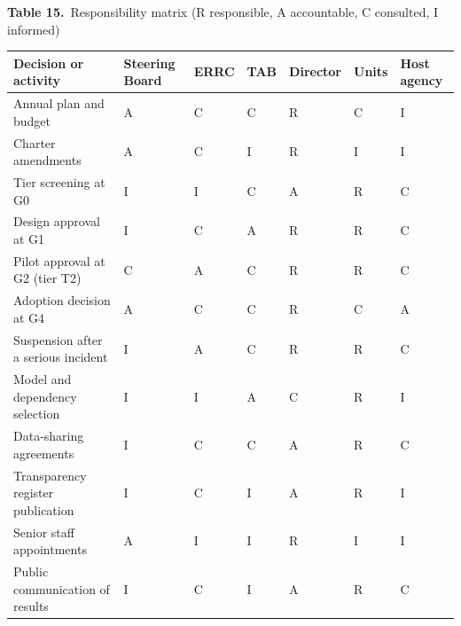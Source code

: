 \documentclass[border=10pt]{standalone}
\begin{document}
\begin{minipage}{22cm}
{\large\bfseries Table 15.}\ {\large Responsibility matrix (R responsible, A accountable, C consulted, I informed)}\par\vspace{7pt}
\small
{}
\begin{tabularx}{\linewidth}{@{}>{\hsize=2.658\hsize\raggedright\arraybackslash}X>{\hsize=0.709\hsize\raggedright\arraybackslash}X>{\hsize=0.709\hsize\raggedright\arraybackslash}X>{\hsize=0.709\hsize\raggedright\arraybackslash}X>{\hsize=0.709\hsize\raggedright\arraybackslash}X>{\hsize=0.709\hsize\raggedright\arraybackslash}X>{\hsize=0.797\hsize\raggedright\arraybackslash}X@{}}
\arrayrulecolor{bapilrule}\toprule
\rowcolor{white}\textbf{Decision or activity} & \textbf{Steering Board} & \textbf{ERRC} & \textbf{TAB} & \textbf{Director} & \textbf{Units} & \textbf{Host agency} \\
\midrule
Annual plan and budget & A & C & C & R & C & I \\
Charter amendments & A & C & I & R & I & I \\
Tier screening at G0 & I & I & C & A & R & C \\
Design approval at G1 & I & C & A & R & R & C \\
Pilot approval at G2 (tier T2) & C & A & C & R & R & C \\
Adoption decision at G4 & A & C & C & R & C & A \\
Suspension after a serious incident & I & A & C & R & R & C \\
Model and dependency selection & I & I & A & C & R & I \\
Data-sharing agreements & I & C & C & A & R & C \\
Transparency register publication & I & C & I & A & R & I \\
Senior staff appointments & A & I & I & R & I & I \\
Public communication of results & I & C & I & A & R & C \\
\bottomrule
\end{tabularx}
\par\vspace{5pt}{\footnotesize\itshape At G4 the Steering Board and the host agency are jointly accountable: the agency owns the operational decision. A marks accountability inside BAPIL; because BAPIL has no legal personality, contracts and data-sharing agreements are signed by the host institution.}
\par{}
\end{minipage}
\end{document}
